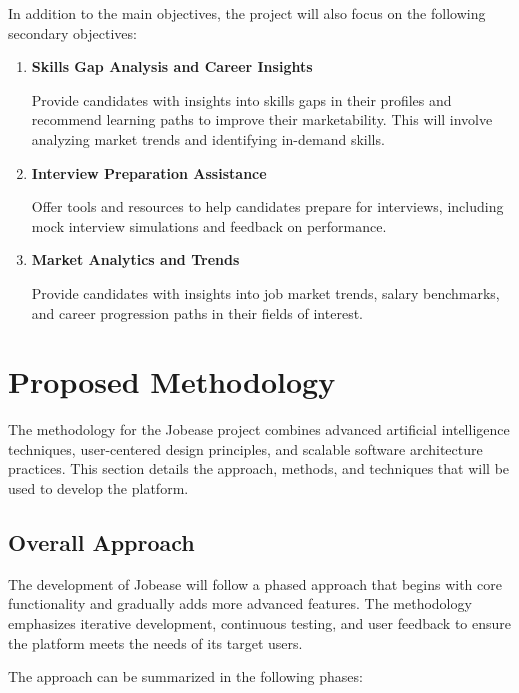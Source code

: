 \documentclass[12pt,a4paper]{report}
\begin{document}
In addition to the main objectives, the project will also focus on the following secondary objectives:

\begin{enumerate}[label=\textbf{S\arabic*.}, align=left]
    \item \textbf{Skills Gap Analysis and Career Insights}
    
    Provide candidates with insights into skills gaps in their profiles and recommend learning paths to improve their marketability. This will involve analyzing market trends and identifying in-demand skills.
    
    \item \textbf{Interview Preparation Assistance}
    
    Offer tools and resources to help candidates prepare for interviews, including mock interview simulations and feedback on performance.
    
    \item \textbf{Market Analytics and Trends}
    
    Provide candidates with insights into job market trends, salary benchmarks, and career progression paths in their fields of interest.
\end{enumerate}

\chapter{Proposed Methodology}

The methodology for the Jobease project combines advanced artificial intelligence techniques, user-centered design principles, and scalable software architecture practices. This section details the approach, methods, and techniques that will be used to develop the platform.

\section*{Overall Approach}

The development of Jobease will follow a phased approach that begins with core functionality and gradually adds more advanced features. The methodology emphasizes iterative development, continuous testing, and user feedback to ensure the platform meets the needs of its target users.

The approach can be summarized in the following phases:
\end{document}
